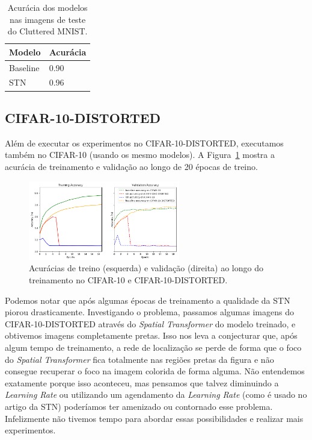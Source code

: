 \documentclass[conference]{IEEEtran}
\begin{document}
\begin{table}[!ht]
  \begin{center}
    \begin{tabular}{|l|l|}
      \hline
      \textbf{Modelo} & \textbf{Acurácia} \\ \hline
      Baseline        & 0.90              \\ \hline
      STN             & 0.96              \\ \hline
    \end{tabular}
  \end{center}
  \caption{Acurácia dos modelos nas imagens de teste do Cluttered MNIST.}
  \label{tab:cm-teste-accs}
\end{table}

\subsection{CIFAR-10-DISTORTED}

Além de executar os experimentos no CIFAR-10-DISTORTED, executamos também no CIFAR-10 (usando os mesmo modelos). A Figura~\ref{fig:c10-training-accs} mostra a acurácia de treinamento e validação ao longo de 20 épocas de treino.

\begin{figure}[ht!]
  \centering
  \includegraphics[width=250px]{img/C10-training-accs.png}
  \caption{Acurácias de treino (esquerda) e validação (direita) ao longo do treinamento no CIFAR-10 e CIFAR-10-DISTORTED.}
  \label{fig:c10-training-accs}
\end{figure}

Podemos notar que após algumas épocas de treinamento a qualidade da STN piorou drasticamente. Investigando o problema, passamos algumas imagens do CIFAR-10-DISTORTED através do \textit{Spatial Transformer} do modelo treinado, e obtivemos imagens completamente pretas. Isso nos leva a conjecturar que, após algum tempo de treinamento, a rede de localização se perde de forma que o foco do \textit{Spatial Transformer} fica totalmente nas regiões pretas da figura e não consegue recuperar o foco na imagem colorida de forma alguma. Não entendemos exatamente porque isso aconteceu, mas pensamos que talvez diminuindo a \textit{Learning Rate} ou utilizando um agendamento da \textit{Learning Rate} (como é usado no artigo da STN) poderíamos ter amenizado ou contornado esse problema. Infelizmente não tivemos tempo para abordar essas possibilidades e realizar mais experimentos.
\end{document}
